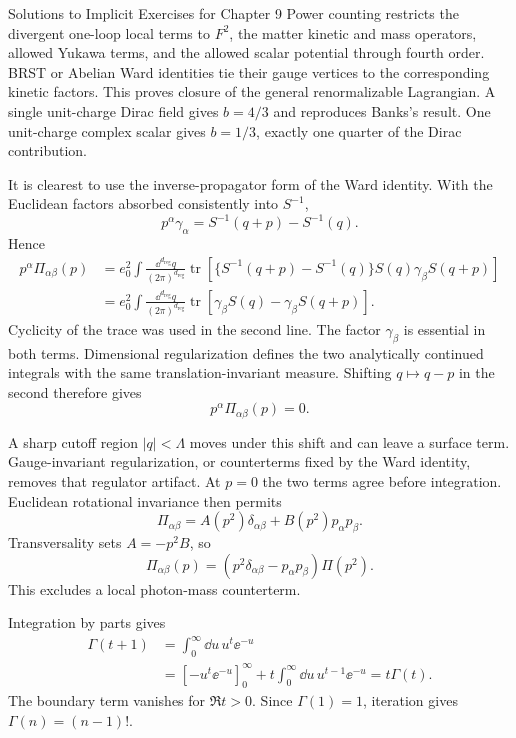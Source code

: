 \begin{bankssolutions}{Solutions to Implicit Exercises for Chapter 9}
Power counting restricts the divergent one-loop local terms to
$F^2$, the matter kinetic and mass operators, allowed Yukawa terms, and the
allowed scalar potential through fourth order.  BRST or Abelian Ward identities
tie their gauge vertices to the corresponding kinetic factors.  This proves
closure of the general renormalizable Lagrangian.  A single unit-charge Dirac
field gives $b=4/3$ and reproduces Banks's result.  One unit-charge complex
scalar gives $b=1/3$, exactly one quarter of the Dirac contribution.

It is clearest to use the inverse-propagator form of the Ward identity.  With
the Euclidean factors absorbed consistently into $S^{-1}$,
\[
  p^\alpha\gamma_\alpha=S^{-1}(q+p)-S^{-1}(q).
\]
Hence
\begin{align*}
  p^\alpha\Pi_{\alpha\beta}(p)
  &=e_0^2\int\frac{\dd^{d_{\mathrm{reg}}}q}{(2\pi)^{d_{\mathrm{reg}}}}
  \operatorname{tr}\!\left[
  \{S^{-1}(q+p)-S^{-1}(q)\}
  S(q)\gamma_\beta S(q+p)\right]\\
  &=e_0^2\int\frac{\dd^{d_{\mathrm{reg}}}q}{(2\pi)^{d_{\mathrm{reg}}}}
  \operatorname{tr}\!\left[\gamma_\beta S(q)
  -\gamma_\beta S(q+p)\right].
\end{align*}
Cyclicity of the trace was used in the second line.  The factor
$\gamma_\beta$ is essential in both terms.  Dimensional regularization defines
the two analytically continued integrals with the same translation-invariant
measure.  Shifting $q\mapsto q-p$ in the second therefore gives
\[
  p^\alpha\Pi_{\alpha\beta}(p)=0.
\]

A sharp cutoff region $|q|<\Lambda$ moves under this shift and can leave a
surface term.  Gauge-invariant regularization, or counterterms fixed by the
Ward identity, removes that regulator artifact.  At $p=0$ the two terms agree
before integration.  Euclidean rotational invariance then permits
\[
  \Pi_{\alpha\beta}=A(p^2)\delta_{\alpha\beta}
  +B(p^2)p_\alpha p_\beta.
\]
Transversality sets $A=-p^2B$, so
\[
  \Pi_{\alpha\beta}(p)=
  (p^2\delta_{\alpha\beta}-p_\alpha p_\beta)\Pi(p^2).
\]
This excludes a local photon-mass counterterm.

Integration by parts gives
\begin{align*}
  \Gamma(t+1)&=\int_0^\infty\dd u\,u^t\ee^{-u}\\
  &=\left[-u^t\ee^{-u}\right]_0^\infty
    +t\int_0^\infty\dd u\,u^{t-1}\ee^{-u}
   =t\Gamma(t).
\end{align*}
The boundary term vanishes for $\Re t>0$.  Since $\Gamma(1)=1$, iteration
gives $\Gamma(n)=(n-1)!$.


\end{bankssolutions}
